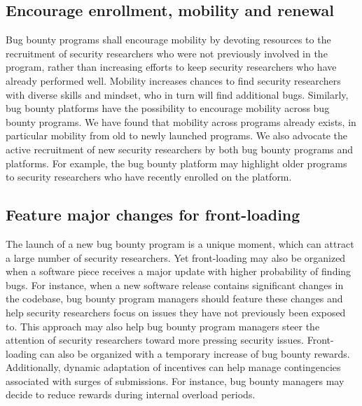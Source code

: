 \subsection{Encourage enrollment, mobility and renewal}
Bug bounty programs shall encourage mobility by devoting resources to the recruitment of security researchers who were not previously involved in the program, rather than increasing efforts to keep security researchers who have already performed well. Mobility increases chances to find security researchers with diverse skills and mindset, who in turn will find additional bugs. Similarly, bug bounty platforms have the possibility to encourage mobility across bug bounty programs. We have found that mobility across programs already exists, in particular mobility from old to newly launched programs. We also advocate the active recruitment of new security researchers by both bug bounty programs and platforms. For example, the bug bounty platform may highlight older programs to security researchers who have recently enrolled on the platform.

\subsection{Feature major changes for front-loading}
The launch of a new bug bounty program is a unique moment, which can attract a large number of security researchers. Yet front-loading may also be organized when a software piece receives a major update with higher probability of finding bugs. For instance, when a new software release contains significant changes in the codebase, bug bounty program managers should feature these changes and help security researchers focus on issues they have not previously been exposed to. This approach may also help bug bounty program managers steer the attention of security researchers toward more pressing security issues. Front-loading can also be organized with a temporary increase of bug bounty rewards. Additionally, dynamic adaptation of incentives can help manage contingencies associated with surges of submissions. For instance, bug bounty managers may decide to reduce rewards during internal overload periods. 
 
